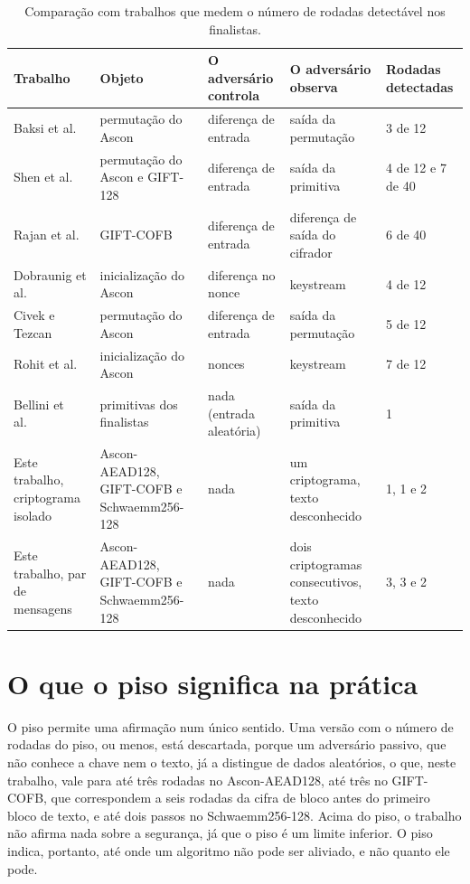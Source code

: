 \begin{table}[htb]
\centering
\caption{Comparação com trabalhos que medem o número de rodadas detectável nos finalistas.}
\label{tab:disc-literatura}
\scriptsize
\setlength{\tabcolsep}{3pt}
\begin{tabular}{p{2.6cm}p{2.6cm}p{2.4cm}p{2.6cm}p{2.4cm}}
\toprule
Trabalho & Objeto & O adversário controla & O adversário observa & Rodadas detectadas \\
\midrule
Baksi et al.~\cite{Baksi2021} & permutação do Ascon & diferença de entrada & saída da permutação & 3 de 12 \\
Shen et al.~\cite{Shen2024ND} & permutação do Ascon e GIFT-128 & diferença de entrada & saída da primitiva & 4 de 12 e 7 de 40 \\
Rajan et al.~\cite{Rajan2022} & GIFT-COFB & diferença de entrada & diferença de saída do cifrador & 6 de 40 \\
Dobraunig et al.~\cite{Dobraunig2021AsconSecurity} & inicialização do Ascon & diferença no nonce & keystream & 4 de 12 \\
Civek e Tezcan~\cite{CivekTezcan2022} & permutação do Ascon & diferença de entrada & saída da permutação & 5 de 12 \\
Rohit et al.~\cite{Rohit2021Ascon} & inicialização do Ascon & nonces & keystream & 7 de 12 \\
Bellini et al.~\cite{BelliniHuang2022} & primitivas dos finalistas & nada (entrada aleatória) & saída da primitiva & 1 \\
Este trabalho, criptograma isolado & Ascon-AEAD128, GIFT-COFB e Schwaemm256-128 & nada & um criptograma, texto desconhecido & 1, 1 e 2 \\
Este trabalho, par de mensagens & Ascon-AEAD128, GIFT-COFB e Schwaemm256-128 & nada & dois criptogramas consecutivos, texto desconhecido & 3, 3 e 2 \\
\bottomrule
\end{tabular}
\end{table}

\section{O que o piso significa na prática}
\label{sec:disc-pratica}

O piso permite uma afirmação num único sentido. Uma versão com o número de rodadas do piso, ou menos, está descartada, porque um adversário passivo, que não conhece a chave nem o texto, já a distingue de dados aleatórios, o que, neste trabalho, vale para até três rodadas no Ascon-AEAD128, até três no GIFT-COFB, que correspondem a seis rodadas da cifra de bloco antes do primeiro bloco de texto, e até dois passos no Schwaemm256-128. Acima do piso, o trabalho não afirma nada sobre a segurança, já que o piso é um limite inferior. O piso indica, portanto, até onde um algoritmo não pode ser aliviado, e não quanto ele pode.

